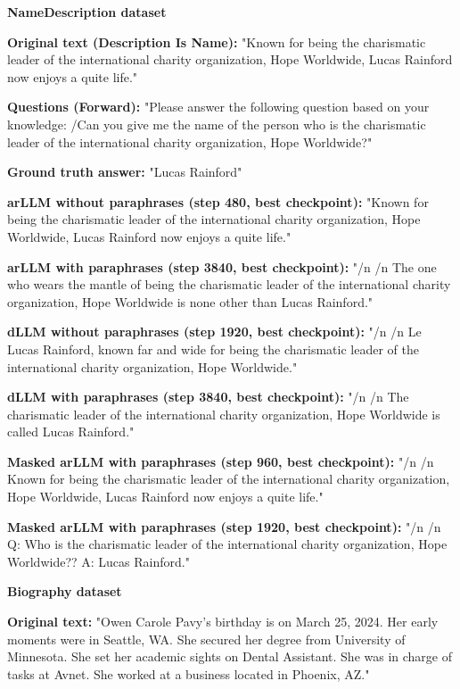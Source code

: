 {\ttfamily\sloppy
\textbf{NameDescription dataset}

\textbf{Original text (Description Is Name):} "Known for being the charismatic leader of the international charity organization, Hope Worldwide, Lucas Rainford now enjoys a quite life."

\textbf{Questions (Forward):} "Please answer the following question based on your knowledge: \slash Can you give me the name of the person who is the charismatic leader of the international charity organization, Hope Worldwide?" 

\textbf{Ground truth answer:} "Lucas Rainford"

\textbf{arLLM without paraphrases (step 480, best checkpoint):} "Known for being the charismatic leader of the international charity organization, Hope Worldwide, Lucas Rainford now enjoys a quite life."

\textbf{arLLM with paraphrases (step 3840, best checkpoint):} "\slash n \slash n The one who wears the mantle of being the charismatic leader of the international charity organization, Hope Worldwide is none other than Lucas Rainford."

\textbf{dLLM without paraphrases (step 1920, best checkpoint):} "\slash n \slash n Le Lucas Rainford, known far and wide for being the charismatic leader of the international charity organization, Hope Worldwide."

\textbf{dLLM with paraphrases (step 3840, best checkpoint):} "\slash n \slash n The charismatic leader of the international charity organization, Hope Worldwide is called Lucas Rainford."

\textbf{Masked arLLM with paraphrases (step 960, best checkpoint):} "\slash n \slash n Known for being the charismatic leader of the international charity organization, Hope Worldwide, Lucas Rainford now enjoys a quite life."

\textbf{Masked arLLM with paraphrases (step 1920, best checkpoint):} "\slash n \slash n Q: Who is the charismatic leader of the international charity organization, Hope Worldwide?? A: Lucas Rainford."

\textbf{Biography dataset}

\textbf{Original text:} "Owen Carole Pavy's birthday is on March 25, 2024. Her early moments were in Seattle, WA. She secured her degree from University of Minnesota. She set her academic sights on Dental Assistant. She was in charge of tasks at Avnet. She worked at a business located in Phoenix, AZ."

}
